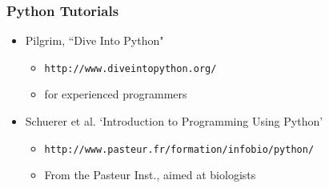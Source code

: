 \documentclass{beamer}
\begin{document}
\begin{frame}
  \frametitle{Python Tutorials}
\begin{itemize}

\item Pilgrim, ``Dive Into Python"
\begin{itemize}
	\item \texttt{http://www.diveintopython.org/}
 	\item for experienced programmers
\end{itemize}

\item Schuerer et al. `Introduction to Programming Using Python'
\begin{itemize}
	\item \texttt{http://www.pasteur.fr/formation/infobio/python/}
	\item From the Pasteur Inst., aimed at biologists
\end{itemize}

\end{itemize}

\end{frame}
\end{document}
